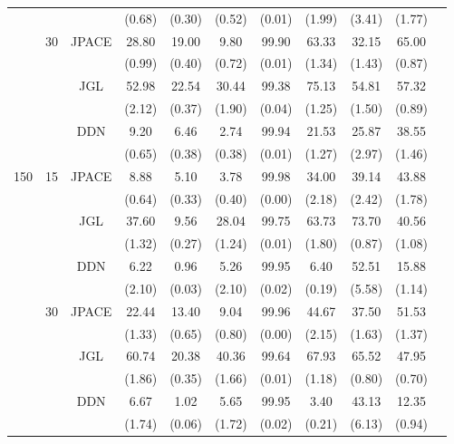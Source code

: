 \documentclass[useAMS,usenatbib,referee]{bio}
\begin{document}
{{\begin{table}[htb!]
{\begin{tabular}{||c|c|c||c|c|c|c|c|c|c||c}
 & & & (0.68) & (0.30) & (0.52) & (0.01) & (1.99) & (3.41) & (1.77) \\\cline{2-10} 
  &\multirow{6}{*}{30}  & \multirow{2}{*}{JPACE} &28.80 & 19.00 & 9.80 & 99.90 & 63.33 & 32.15 & 65.00 \\ 
& & & (0.99) & (0.40) & (0.72) & (0.01) & (1.34) & (1.43) & (0.87) \\ \cline{3-10} 
& & \multirow{2}{*}{JGL} & 52.98 & 22.54 & 30.44 & 99.38 & 75.13 & 54.81 & 57.32 \\ 
 & & & (2.12) & (0.37) & (1.90) & (0.04) & (1.25) & (1.50) & (0.89) \\ \cline{3-10} 
& & \multirow{2}{*}{DDN} & 9.20 & 6.46 & 2.74 & 99.94 & 21.53 & 25.87 & 38.55 \\ 
 & & & (0.65) & (0.38) & (0.38) & (0.01) & (1.27) & (2.97) & (1.46) \\\cline{1-10} 
\multirow{12}{*}{150}  &\multirow{6}{*}{15}  & \multirow{2}{*}{JPACE} &8.88 & 5.10 & 3.78 & 99.98 & 34.00 & 39.14 & 43.88 \\ 
& & & (0.64) & (0.33) & (0.40) & (0.00) & (2.18) & (2.42) & (1.78) \\ \cline{3-10} 
& & \multirow{2}{*}{JGL} & 37.60 & 9.56 & 28.04 & 99.75 & 63.73 & 73.70 & 40.56 \\ 
 & & & (1.32) & (0.27) & (1.24) & (0.01) & (1.80) & (0.87) & (1.08) \\ \cline{3-10} 
& & \multirow{2}{*}{DDN} & 6.22 & 0.96 & 5.26 & 99.95 & 6.40 & 52.51 & 15.88 \\ 
 & & & (2.10) & (0.03) & (2.10) & (0.02) & (0.19) & (5.58) & (1.14) \\\cline{2-10} 
  &\multirow{6}{*}{30}  & \multirow{2}{*}{JPACE} &22.44 & 13.40 & 9.04 & 99.96 & 44.67 & 37.50 & 51.53 \\ 
& & & (1.33) & (0.65) & (0.80) & (0.00) & (2.15) & (1.63) & (1.37) \\ \cline{3-10} 
& & \multirow{2}{*}{JGL} & 60.74 & 20.38 & 40.36 & 99.64 & 67.93 & 65.52 & 47.95 \\ 
 & & & (1.86) & (0.35) & (1.66) & (0.01) & (1.18) & (0.80) & (0.70) \\ \cline{3-10} 
& & \multirow{2}{*}{DDN} & 6.67 & 1.02 & 5.65 & 99.95 & 3.40 & 43.13 & 12.35 \\ 
 & & & (1.74) & (0.06) & (1.72) & (0.02) & (0.21) & (6.13) & (0.94) \\\cline{1-10} 

\end{tabular}
}
\end{table}



}}
\end{document}
